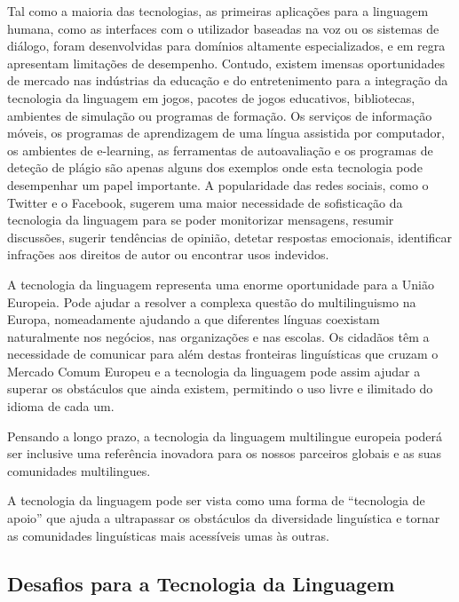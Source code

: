 \begin{multicols}{2}
Tal como a maioria das tecnologias, as primeiras aplicações para a linguagem humana, como as interfaces com o utilizador baseadas na voz 
ou os sistemas de diálogo, foram desenvolvidas para domínios altamente especializados, e em regra apresentam limitações de desempenho. 
Contudo, existem imensas oportunidades de mercado nas indústrias da educação e do entretenimento para a integração da tecnologia da linguagem em jogos, 
pacotes de jogos e\-du\-ca\-ti\-vos, bibliotecas, ambientes de simulação ou programas de formação. 
Os serviços de informação móveis, os programas de aprendizagem de uma língua assistida por computador, os ambientes de e-learning, as ferramentas de autoavaliação e os programas de deteção de plágio são apenas alguns dos exemplos onde esta tecnologia pode desempenhar um papel importante. A popularidade das redes sociais, como o Twitter e o Facebook, sugerem uma maior necessidade de sofisticação da tecnologia da linguagem para se poder monitorizar mensagens, resumir discussões, sugerir tendências de opinião, detetar respostas emocionais, identificar infrações aos direitos de autor ou encontrar usos indevidos.


A tecnologia da linguagem representa uma enorme oportunidade para a União Europeia. Pode ajudar a resolver a complexa questão do multilinguismo na Europa, nomeadamente ajudando a que diferentes línguas coexistam naturalmente nos negócios, nas organizações e nas escolas. Os cidadãos têm a necessidade de comunicar para além destas fronteiras linguísticas que cruzam o Mercado Comum Europeu e a tecnologia da linguagem pode assim ajudar a superar os obstáculos que ainda existem, permitindo o uso livre e ilimitado do idioma de cada um. 

Pensando a longo prazo, a tecnologia da linguagem multilingue europeia poderá ser inclusive
uma referência inovadora para os nossos parceiros globais e as suas comunidades multilingues. 

A tecnologia da linguagem pode ser vista como uma forma de “tecnologia de apoio” que ajuda a ultrapassar os obstáculos da diversidade linguística e tornar as comunidades linguísticas mais acessíveis umas às outras.


\subsection{Desafios para a Tecnologia da Linguagem}


\end{multicols}
